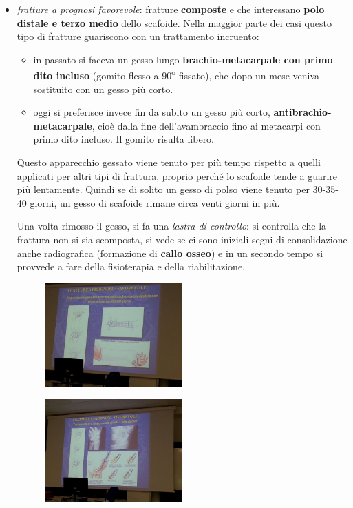 \begin{itemize}
\item
  \emph{fratture a prognosi favorevole}: fratture \textbf{composte} e che interessano \textbf{polo distale e terzo medio} dello scafoide.
Nella maggior parte dei casi questo tipo di fratture guariscono con un trattamento incruento:
\begin{itemize}
\item
  in passato si faceva un gesso lungo \textbf{brachio-metacarpale con primo dito incluso} (gomito flesso a 90\textsuperscript{o} fissato), che dopo un mese veniva sostituito con un gesso più corto.
\item
  oggi si preferisce invece fin da subito un gesso più corto, \textbf{antibrachio-metacarpale}, cioè dalla fine dell'avambraccio fino ai metacarpi con primo dito incluso. Il gomito risulta libero.
\end{itemize}
Questo apparecchio gessato viene tenuto per più tempo rispetto a quelli applicati per altri tipi di frattura, proprio perché lo scafoide tende a
guarire più lentamente. Quindi se di solito un gesso di polso viene tenuto per 30-35-40 giorni, un gesso di scafoide rimane circa venti giorni in più.

Una volta rimosso il gesso, si fa una \emph{lastra di controllo}: si controlla che la frattura non si sia scomposta, si vede se ci sono iniziali segni di consolidazione anche radiografica (formazione di
\textbf{callo osseo}) e in un secondo tempo si provvede a fare della fisioterapia e della riabilitazione.

\begin{figure}[!ht]
\centering
\includegraphics[width=0.5\textwidth]{004/image2.jpeg}
\end{figure}

\begin{figure}[!ht]
\centering
\includegraphics[width=0.5\textwidth]{004/image3.jpeg}
\end{figure}


\end{itemize}
